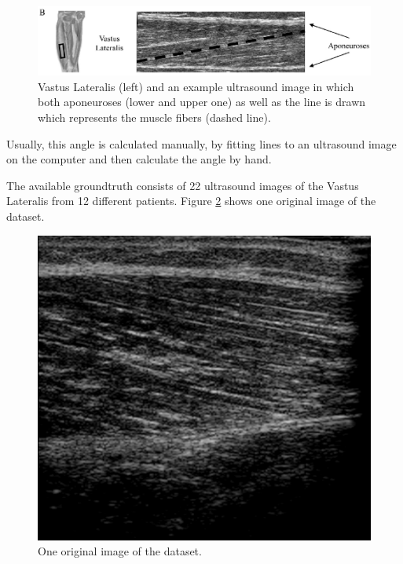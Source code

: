 \documentclass[10pt,twocolumn,letterpaper]{article}
\begin{document}
\begin{figure}
	\begin{center}		
		\includegraphics[width=1\linewidth]{img/VastusLateralis}
	\end{center}
	\caption{Vastus Lateralis (left) and an example ultrasound image in which both aponeuroses (lower and upper one) as well as the line is drawn which represents the muscle fibers (dashed line). \cite{NCronin13a}}
	\label{fig:VastusLateralis}
	
\end{figure}

Usually, this angle is calculated manually, by fitting lines to an ultrasound image on the computer and then calculate the angle by hand.

The available groundtruth consists of 22 ultrasound images of the Vastus Lateralis from 12 different patients.
Figure \ref{fig:im1_orig} shows one original image of the dataset.

\begin{figure}
	\begin{center}		
		\includegraphics[width=1\linewidth]{img/im1_original}
	\end{center}
	\caption{One original image of the dataset.}
	\label{fig:im1_orig}
	
\end{figure}
\end{document}
